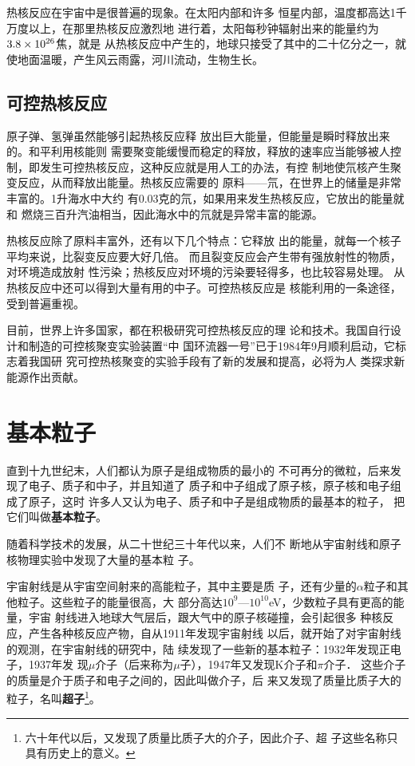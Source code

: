 热核反应在宇宙中是很普遍的现象。在太阳内部和许多
恒星内部，温度都高达1千万度以上，在那里热核反应激烈地
进行着，太阳每秒钟辐射出来的能量约为$3.8\times10^{26}$焦，就是
从热核反应中产生的，地球只接受了其中的二十亿分之一，就
使地面温暖，产生风云雨露，河川流动，生物生长。

\subsection{可控热核反应}

原子弹、氢弹虽然能够引起热核反应释
放出巨大能量，但能量是瞬时释放出来的。和平利用核能则
需要聚变能缓慢而稳定的释放，释放的速率应当能够被人控
制，即发生可控热核反应，这种反应就是用人工的办法，有控
制地使氘核产生聚变反应，从而释放出能量。热核反应需要的
原料——氘，在世界上的储量是非常丰富的。1升海水中大约
有0.03克的氘，如果用来发生热核反应，它放出的能量就和
燃烧三百升汽油相当，因此海水中的氘就是异常丰富的能源。

热核反应除了原料丰富外，还有以下几个特点：它释放
出的能量，就每一个核子平均来说，比裂变反应要大好几倍。
而且裂变反应会产生带有强放射性的物质，对环境造成放射
性污染；热核反应对环境的污染要轻得多，也比较容易处理。
从热核反应中还可以得到大量有用的中子。可控热核反应是
核能利用的一条途径，受到普遍重视。

目前，世界上许多国家，都在积极研究可控热核反应的理
论和技术。我国自行设计和制造的可控核聚变实验装置“中
国环流器一号”已于1984年9月顺利启动，它标志着我国研
究可控热核聚变的实验手段有了新的发展和提高，必将为人
类探求新能源作出贡献。

\section{基本粒子}

直到十九世纪末，人们都认为原子是组成物质的最小的
不可再分的微粒，后来发现了电子、质子和中子，并且知道了
质子和中子组成了原子核，原子核和电子组成了原子，这时
许多人又认为电子、质子和中子是组成物质的最基本的粒子，
把它们叫做\textbf{基本粒子}。

随着科学技术的发展，从二十世纪三十年代以来，人们不
断地从宇宙射线和原子核物理实验中发现了大量的基本粒
子。

宇宙射线是从宇宙空间射来的高能粒子，其中主要是质
子，还有少量的$\alpha$粒子和其他粒子。这些粒子的能量很高，大
部分高达$10^9$—$10^{10}$eV，少数粒子具有更高的能量，宇宙
射线进入地球大气层后，跟大气中的原子核碰撞，会引起很多
种核反应，产生各种核反应产物，自从1911年发现宇宙射线
以后，就开始了对宇宙射线的观测，在宇宙射线的研究中，陆
续发现了一些新的基本粒子：1932年发现正电子，1937年发
现$\mu$介子（后来称为$\mu$子），1947年又发现K介子和$\pi$介子．
这些介子的质量是介于质子和电子之间的，因此叫做介子，后
来又发现了质量比质子大的粒子，名叫\textbf{超子}\footnote{六十年代以后，又发现了质量比质子大的介子，因此介子、超
子这些名称只具有历史上的意义。}。

